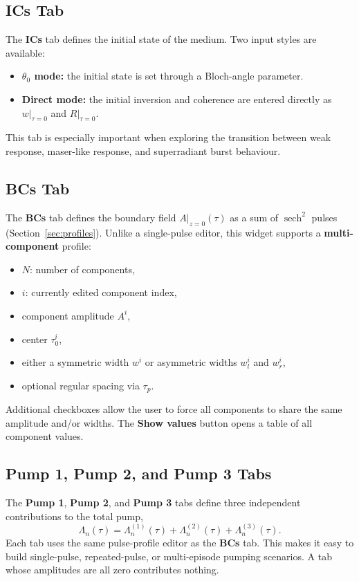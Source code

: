 \documentclass[12pt,a4paper]{article}
\newcommand{\tab}[1]{\textbf{#1}}
\newcommand{\sech}{\operatorname{sech}}
\begin{document}
\subsection{ICs Tab}

The \tab{ICs} tab defines the initial state of the medium. Two input styles are available:
\begin{itemize}[noitemsep]
  \item \textbf{$\theta_0$ mode:} the initial state is set through a Bloch-angle parameter.
  \item \textbf{Direct mode:} the initial inversion and coherence are entered directly as $w\vert_{\tau=0}$ and $R\vert_{\tau=0}$.
\end{itemize}

This tab is especially important when exploring the transition between weak response, maser-like response,
and superradiant burst behaviour.

\subsection{BCs Tab}

The \tab{BCs} tab defines the boundary field $A\vert_{z=0}(\tau)$ as a sum of
$\sech^2$ pulses (Section~\ref{sec:profiles}).
Unlike a single-pulse editor, this widget supports a \textbf{multi-component} profile:
\begin{itemize}[noitemsep]
  \item \textbf{$N$}: number of components,
  \item \textbf{$i$}: currently edited component index,
  \item component amplitude $A^i$,
  \item center $\tau_0^i$,
  \item either a symmetric width $w^i$ or asymmetric widths $w_l^i$ and $w_r^i$,
  \item optional regular spacing via $\tau_p$.
\end{itemize}

Additional checkboxes allow the user to force all components to share the same amplitude and/or widths.
The \textbf{Show values} button opens a table of all component values.

\subsection{Pump 1, Pump 2, and Pump 3 Tabs}

The \tab{Pump 1}, \tab{Pump 2}, and \tab{Pump 3} tabs define three
independent contributions to the total pump,
\begin{equation}
  \Lambda_n(\tau)=\Lambda_n^{(1)}(\tau)+\Lambda_n^{(2)}(\tau)+\Lambda_n^{(3)}(\tau).
\end{equation}
Each tab uses the same pulse-profile editor as the \tab{BCs} tab. This makes
it easy to build single-pulse, repeated-pulse, or multi-episode pumping
scenarios. A tab whose amplitudes are all zero contributes nothing.
\end{document}

